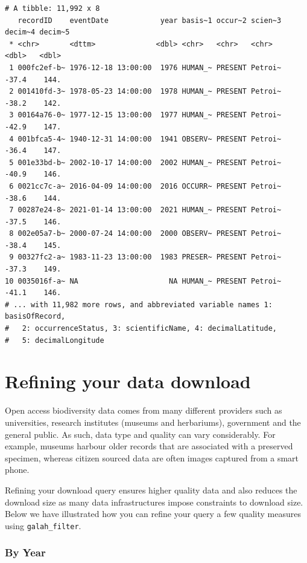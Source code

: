 \documentclass[
  letterpaper,
  DIV=11,
  numbers=noendperiod,
  oneside]{scrreprt}
\begin{document}
\begin{verbatim}
# A tibble: 11,992 x 8
   recordID    eventDate            year basis~1 occur~2 scien~3 decim~4 decim~5
 * <chr>       <dttm>              <dbl> <chr>   <chr>   <chr>     <dbl>   <dbl>
 1 000fc2ef-b~ 1976-12-18 13:00:00  1976 HUMAN_~ PRESENT Petroi~   -37.4    144.
 2 001410fd-3~ 1978-05-23 14:00:00  1978 HUMAN_~ PRESENT Petroi~   -38.2    142.
 3 00164a76-0~ 1977-12-15 13:00:00  1977 HUMAN_~ PRESENT Petroi~   -42.9    147.
 4 001bfca5-4~ 1940-12-31 14:00:00  1941 OBSERV~ PRESENT Petroi~   -36.4    147.
 5 001e33bd-b~ 2002-10-17 14:00:00  2002 HUMAN_~ PRESENT Petroi~   -40.9    146.
 6 0021cc7c-a~ 2016-04-09 14:00:00  2016 OCCURR~ PRESENT Petroi~   -38.6    144.
 7 00287e24-8~ 2021-01-14 13:00:00  2021 HUMAN_~ PRESENT Petroi~   -37.5    146.
 8 002e05a7-b~ 2000-07-24 14:00:00  2000 OBSERV~ PRESENT Petroi~   -38.4    145.
 9 00327fc2-a~ 1983-11-23 13:00:00  1983 PRESER~ PRESENT Petroi~   -37.3    149.
10 0035016f-a~ NA                     NA HUMAN_~ PRESENT Petroi~   -41.1    146.
# ... with 11,982 more rows, and abbreviated variable names 1: basisOfRecord,
#   2: occurrenceStatus, 3: scientificName, 4: decimalLatitude,
#   5: decimalLongitude
\end{verbatim}

\hypertarget{refining-your-data-download}{%
\section{Refining your data
download}\label{refining-your-data-download}}

Open access biodiversity data comes from many different providers such
as universities, research institutes (museums and herbariums),
government and the general public. As such, data type and quality can
vary considerably. For example, museums harbour older records that are
associated with a preserved specimen, whereas citizen sourced data are
often images captured from a smart phone.

Refining your download query ensures higher quality data and also
reduces the download size as many data infrastructures impose
constraints to download size. Below we have illustrated how you can
refine your query a few quality measures using \texttt{galah\_filter}.

\hypertarget{by-year}{%
\subsubsection{By Year}\label{by-year}}
\end{document}
